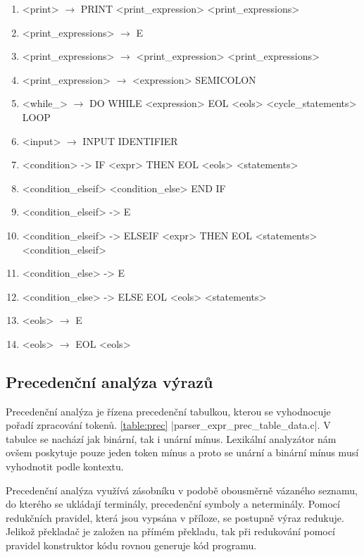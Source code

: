 \begin{normalsize}
\begin{enumerate}
\item <print> $\rightarrow$ PRINT <print\_expression> <print\_expressions>
\item <print\_expressions> $\rightarrow$ E
\item <print\_expressions> $\rightarrow$ <print\_expression> <print\_expressions>
\item <print\_expression> $\rightarrow$ <expression> SEMICOLON

\item <while\_> $\rightarrow$ DO WHILE <expression> EOL <eols> <cycle\_statements> LOOP

\item <input> $\rightarrow$ INPUT IDENTIFIER

\item <condition> -> IF <expr> THEN EOL <eols> <statements>
\item <condition\_elseif> <condition\_else> END IF
\item <condition\_elseif> -> E
\item <condition\_elseif> -> ELSEIF <expr> THEN EOL <statements> <condition\_elseif>

\item <condition\_else> -> E
\item <condition\_else> -> ELSE EOL <eols> <statements>

\item <eols> $\rightarrow$ E
\item <eols> $\rightarrow$ EOL <eols>

\end{enumerate}
\end{normalsize}
\subsection{Precedenční analýza výrazů}
Precedenční analýza je řízena precedenční tabulkou, kterou se vyhodnocuje pořadí zpracování tokenů. \ref{table:prec}
\ic|parser_expr_prec_table_data.c|. V tabulce se nachází jak binární, tak i unární mínus. 
Lexikální analyzátor nám ovšem poskytuje pouze jeden token mínus a proto se unární a binární mínus
musí vyhodnotit podle kontextu.

Precedenční analýza využívá zásobníku v podobě obousměrně vázaného seznamu, do kterého se ukládají terminály,
precedenční symboly a neterminály. Pomocí redukčních pravidel, která jsou vypsána v příloze, se postupně výraz redukuje. 
Jelikož překladač je založen na přímém překladu, tak při redukování pomocí pravidel konstruktor kódu rovnou generuje kód programu.

